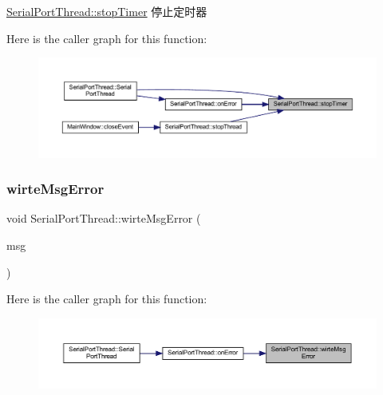 \mbox{\hyperlink{class_serial_port_thread_adfceb467826dc0f59d0eb66c1ba0a1a6}{Serial\+Port\+Thread\+::stop\+Timer}} 停止定时器 

Here is the caller graph for this function\+:
\nopagebreak
\begin{figure}[H]
\begin{center}
\leavevmode
\includegraphics[width=350pt]{class_serial_port_thread_adfceb467826dc0f59d0eb66c1ba0a1a6_icgraph}
\end{center}
\end{figure}
\mbox{\label{class_serial_port_thread_a7ba1cacdedbb7c158750553adbd13669}} 
\subsubsection{\texorpdfstring{wirteMsgError}{wirteMsgError}}
{\footnotesize\ttfamily void Serial\+Port\+Thread\+::wirte\+Msg\+Error (\begin{DoxyParamCaption}\item[{Q\+String}]{msg }\end{DoxyParamCaption})\hspace{0.3cm}{\ttfamily [signal]}}

Here is the caller graph for this function\+:
\nopagebreak
\begin{figure}[H]
\begin{center}
\leavevmode
\includegraphics[width=350pt]{class_serial_port_thread_a7ba1cacdedbb7c158750553adbd13669_icgraph}
\end{center}
\end{figure}
\mbox{\label{class_serial_port_thread_a16e0dbd72535df1b954ed3c4598f633a}} 
